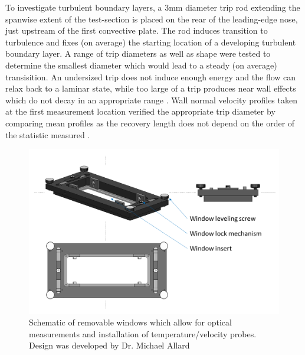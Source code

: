To investigate turbulent boundary layers, a 3mm diameter trip rod extending the spanwise extent of the test-section is placed on the rear of the leading-edge nose, just upstream of the first convective plate.
The rod induces transition to turbulence and fixes (on average) the starting location of a developing turbulent boundary layer.
A range of trip diameters as well as shape were tested to determine the smallest diameter which would lead to a steady (on average) transisition. 
An undersized trip does not induce enough energy and the flow can relax back to a laminar state, while too large of a trip produces near wall effects which do not decay in an appropriate range \cite{Marusic2015}.
Wall normal velocity profiles taken at the first measurement location verified the appropriate trip diameter by comparing mean profiles as the recovery length does not depend on the order of the statistic measured \cite{Marusic2015}.


\begin{figure}[h!]
\centering
\includegraphics[scale=.45]{figures/facility/tunnelwindows.png}
\caption{Schematic of removable windows which allow for optical measurements and installation of temperature/velocity probes. Design was developed by Dr. Michael Allard}
\label{fig:tunnelWindow}
\end{figure}

